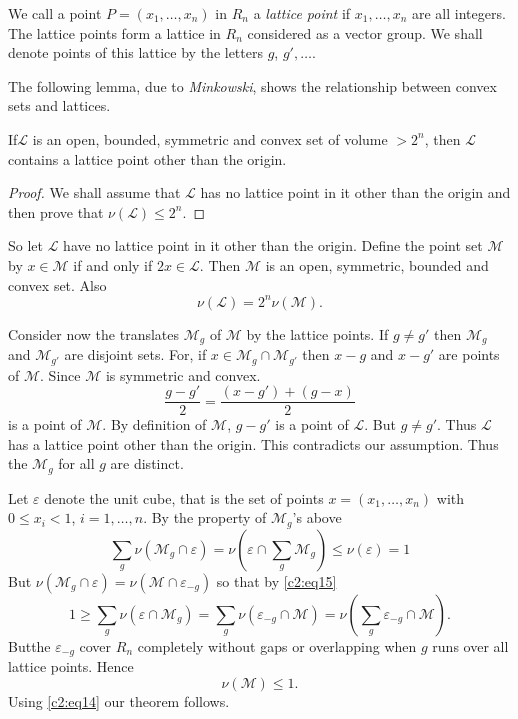 We call a point $P=(x_{1},\ldots,x_{n})$ in $R_{n}$ a {\em lattice
  point} if $x_{1},\ldots,x_{n}$ are all integers. The lattice points
form a lattice in $R_{n}$ considered as a vector group. We shall
denote points of this lattice by the letters $g$, $g',\ldots$.

The following lemma, due to {\em Minkowski}, shows the relationship
between convex sets and lattices.

\begin{lem}\label{chap2:lem3}
If\pageoriginale $\mathscr{L}$ is an open, bounded, symmetric and
convex set of volume $>2^{n}$, then $\mathscr{L}$ contains a lattice
point other than the origin.
\end{lem}

\begin{proof}
We shall assume that $\mathscr{L}$ has no lattice point in it other
than the origin and then prove that $\nu(\mathscr{L})\leq 2^{n}$.
\end{proof}

So let $\mathscr{L}$ have no lattice point in it other than the
origin. Define the point set $\mathscr{M}$ by $x\in\mathscr{M}$ if and
only if $2x\in\mathscr{L}$. Then $\mathscr{M}$ is an open, symmetric,
bounded and convex set. Also
\begin{equation*}
\nu(\mathscr{L})=2^{n}\nu(\mathscr{M}).\tag{14}\label{c2:eq14}
\end{equation*}

Consider now the translates $\mathscr{M}_{g}$ of $\mathscr{M}$ by the
lattice points. If $g\neq g'$ then $\mathscr{M}_{g}$ and
$\mathscr{M}_{g'}$ are disjoint sets. For, if $x\in\mathscr{M}_{g}\cap
\mathscr{M}_{g'}$ then $x-g$ and $x-g'$ are points of
$\mathscr{M}$. Since $\mathscr{M}$ is symmetric and convex.
$$
\frac{g-g'}{2}=\frac{(x-g')+(g-x)}{2}
$$
is a point of $\mathscr{M}$. By definition of $\mathscr{M}$, $g - g'$ is
a point of $\mathscr{L}$. But $g\neq g'$. Thus $\mathscr{L}$ has a
lattice point other than the origin. This contradicts our
assumption. Thus the $\mathscr{M}_{g}$ for all $g$ are distinct.

Let $\varepsilon$ denote the unit cube, that is the set of points
$x=(x_{1},\ldots,x_{n})$ with $0\leq x_{i}<1$, $i=1,\ldots,n$. By the
property of $\mathscr{M}_{g}$'s above
\begin{equation*}
\sum_{g}\nu(\mathscr{M}_{g}\cap \varepsilon)=\nu(\varepsilon\cap
\sum_{g}\mathscr{M}_{g})\leq \nu(\varepsilon)=1\tag{15}\label{c2:eq15}
\end{equation*}
But $\nu(\mathscr{M}_{g}\cap
\varepsilon)=\nu(\mathscr{M}\cap\varepsilon_{-g})$ so that by \eqref{c2:eq15}
$$
1\geq
\sum_{g}\nu(\varepsilon\cap\mathscr{M}_{g})=\sum_{g}\nu(\varepsilon_{-g}\cap\mathscr{M})=\nu(\sum_{g}\varepsilon_{-g}\cap\mathscr{M}). 
$$
But\pageoriginale the $\varepsilon_{-g}$ cover $R_{n}$ completely without gaps or
overlapping when $g$ runs over all lattice points. Hence
$$
\nu(\mathscr{M})\leq 1.
$$
Using \eqref{c2:eq14} our theorem follows.

